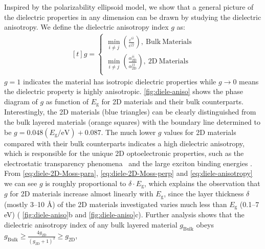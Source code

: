 Inspired by the polarizability ellipsoid model, we show that a general picture of the dielectric properties in
any dimension can be drawn by studying the dielectric
anisotropy. We define the dielectric anisotropy index $g$ as:
\begin{equation}
  \label{eq:diele-anisotropy}
  \begin{aligned}[t]
    g =
    \begin{cases}
      {\displaystyle \min_{i \neq j}}
      {\displaystyle
        \left(\frac{\varepsilon^{ii}}{\varepsilon^{jj}}\right)},
      \ \mathrm{Bulk\ Materials}\\
      {\displaystyle \min_{i \neq j}}
      {\displaystyle
        \left(\frac{\alpha_{\mathrm{2D}}^{ii}}{\alpha_{\mathrm{2D}}^{jj}}\right)},
      \ \mathrm{2D\ Materials}\\
    \end{cases}
  \end{aligned}
\end{equation}
$g=1$ indicates the material has isotropic dielectric properties while
$g \to 0$ means the dielectric property is highly anisotropic.
\autoref{fig:diele-aniso} shows the phase diagram of $g$ as function
of $E_{\mathrm{g}}$ for 2D materials and their bulk
counterparts. Interestingly, the 2D materials (blue triangles) can be
clearly distinguished from the bulk layered materials (orange squares)
with the boundary line determined to be
$g =0.048 (E_{\mathrm{g}}/ \mathrm{eV})+0.087$. The much lower $g$
values for 2D materials compared with their bulk counterparts
indicates a high dielectric anisotropy, which is responsible for the
unique 2D optoelectronic properties, such as the electrostatic
transparency phenomena~\cite{Li_2014_screen} and the large exciton binding energies
\cite{Pulci_2014_exciton,Tran_2014_gap_ML_BP,Chernikov_2014_EB_MoS2_2D3D,Berkelbach_2013_exciton}. From
\autoref{eq:diele-2D-Moss-para}, \autoref{eq:diele-2D-Moss-perp} and
\autoref{eq:diele-anisotropy} we can see $g$ is roughly proportional
to $\delta \cdot E_{\mathrm{g}}$, which explains the observation that
$g$ for 2D materials increase almost linearly with $E_{\mathrm{g}}$,
since the layer thickness $\delta$ (mostly 3--10 \AA{}) of the 2D
materials investigated varies much less than $E_{\mathrm{g}}$ (0.1--7
eV) ( \autoref{fig:diele-aniso}b and
\autoref{fig:diele-aniso}c). Further analysis shows that the
dielectric anisotropy index of any bulk layered material
$g_{\mathrm{Bulk}}$ obeys
$g_{\mathrm{Bulk}} \geq {\displaystyle \frac{4
    g_{\mathrm{2D}}}{(g_{\mathrm{2D}}+1)^{2}}} \geq g_{\mathrm{2D}}$,

